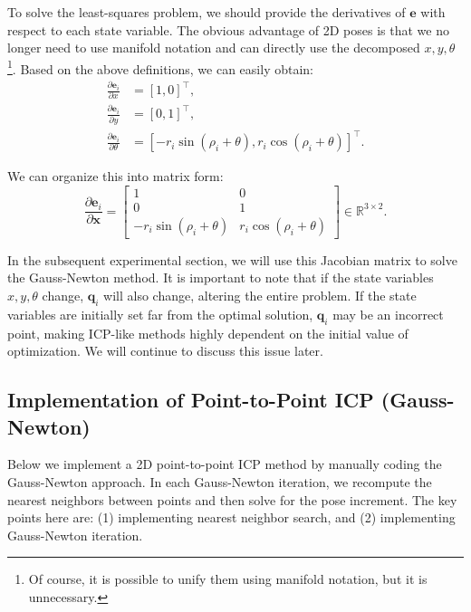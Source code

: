 To solve the least-squares problem, we should provide the derivatives of $\bm{e}$ with respect to each state variable. The obvious advantage of 2D poses is that we no longer need to use manifold notation and can directly use the decomposed $x, y, \theta$\footnote{Of course, it is possible to unify them using manifold notation, but it is unnecessary.}. Based on the above definitions, we can easily obtain:
\begin{subequations}\label{key}
	\begin{align}
		\frac{\partial{\bm{e}_i}}{\partial x} &= [1, 0]^\top, \\
		\frac{\partial{\bm{e}_i}}{\partial y} &= [0, 1]^\top, \\
		\frac{\partial{\bm{e}_i}}{\partial \theta} &= [-r_i \sin (\rho_i + \theta), r_i \cos (\rho_i+\theta)]^\top.
	\end{align}
\end{subequations}

We can organize this into matrix form:
\begin{equation}\label{eq:dpw-dx}
	\frac{\partial \bm{e}_i}{\partial \bm{x}} = \begin{bmatrix}
		1 & 0\\
		0 & 1\\
		-r_i \sin (\rho_i + \theta) & r_i \cos (\rho_i+\theta)
	\end{bmatrix} \in \mathbb{R}^{3\times 2}.
\end{equation}

In the subsequent experimental section, we will use this Jacobian matrix to solve the Gauss-Newton method. It is important to note that if the state variables $x, y, \theta$ change, $\bm{q}_i$ will also change, altering the entire problem. If the state variables are initially set far from the optimal solution, $\bm{q}_i$ may be an incorrect point, making ICP-like methods highly dependent on the initial value of optimization. We will continue to discuss this issue later.

\subsection{Implementation of Point-to-Point ICP (Gauss-Newton)}  
Below we implement a 2D point-to-point ICP method by manually coding the Gauss-Newton approach. In each Gauss-Newton iteration, we recompute the nearest neighbors between points and then solve for the pose increment. The key points here are: (1) implementing nearest neighbor search, and (2) implementing Gauss-Newton iteration.  

